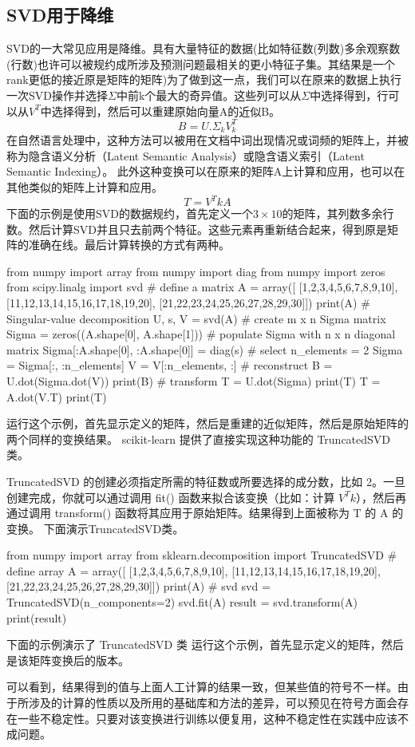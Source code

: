 \subsection{SVD用于降维}
SVD的一大常见应用是降维。具有大量特征的数据(比如特征数(列数)多余观察数(行数)也许可以被规约成所涉及预测问题最相关的更小特征子集。其结果是一个rank更低的接近原是矩阵的矩阵)为了做到这一点，我们可以在原来的数据上执行一次SVD操作并选择$\Sigma$中前k个最大的奇异值。这些列可以从$\Sigma$中选择得到，行可以从$V^T$中选择得到，然后可以重建原始向量A的近似B。
\[B=U.\Sigma_kV^T_k\]
在自然语言处理中，这种方法可以被用在文档中词出现情况或词频的矩阵上，并被称为隐含语义分析（Latent Semantic Analysis）或隐含语义索引（Latent Semantic Indexing）。 此外这种变换可以在原来的矩阵A上计算和应用，也可以在其他类似的矩阵上计算和应用。
\[T=V^TkA\]
下面的示例是使用SVD的数据规约，首先定义一个$3\times10$的矩阵，其列数多余行数。然后计算SVD并且只去前两个特征。这些元素再重新结合起来，得到原是矩阵的准确在线。最后计算转换的方式有两种。
\begin{python}
from numpy import array
from numpy import diag
from numpy import zeros
from scipy.linalg import svd
# define a matrix
A = array([
	[1,2,3,4,5,6,7,8,9,10],
	[11,12,13,14,15,16,17,18,19,20],
	[21,22,23,24,25,26,27,28,29,30]])
print(A)
# Singular-value decomposition
U, s, V = svd(A)
# create m x n Sigma matrix
Sigma = zeros((A.shape[0], A.shape[1]))
# populate Sigma with n x n diagonal matrix
Sigma[:A.shape[0], :A.shape[0]] = diag(s)
# select
n_elements = 2
Sigma = Sigma[:, :n_elements]
V = V[:n_elements, :]
# reconstruct
B = U.dot(Sigma.dot(V))
print(B)
# transform
T = U.dot(Sigma)
print(T)
T = A.dot(V.T)
print(T)
\end{python}

运行这个示例，首先显示定义的矩阵，然后是重建的近似矩阵，然后是原始矩阵的两个同样的变换结果。
scikit-learn 提供了直接实现这种功能的 TruncatedSVD 类。 

TruncatedSVD 的创建必须指定所需的特征数或所要选择的成分数，比如 2。一旦创建完成，你就可以通过调用 fit() 函数来拟合该变换（比如：计算 $V^Tk$），然后再通过调用 transform() 函数将其应用于原始矩阵。结果得到上面被称为 T 的 A 的变换。
下面演示TruncatedSVD类。
\begin{python}

from numpy import array
from sklearn.decomposition import TruncatedSVD
# define array
A = array([
	[1,2,3,4,5,6,7,8,9,10],
	[11,12,13,14,15,16,17,18,19,20],
	[21,22,23,24,25,26,27,28,29,30]])
print(A)
# svd
svd = TruncatedSVD(n_components=2)
svd.fit(A)
result = svd.transform(A)
print(result)
\end{python}
下面的示例演示了 TruncatedSVD 类
运行这个示例，首先显示定义的矩阵，然后是该矩阵变换后的版本。

可以看到，结果得到的值与上面人工计算的结果一致，但某些值的符号不一样。由于所涉及的计算的性质以及所用的基础库和方法的差异，可以预见在符号方面会存在一些不稳定性。只要对该变换进行训练以便复用，这种不稳定性在实践中应该不成问题。
